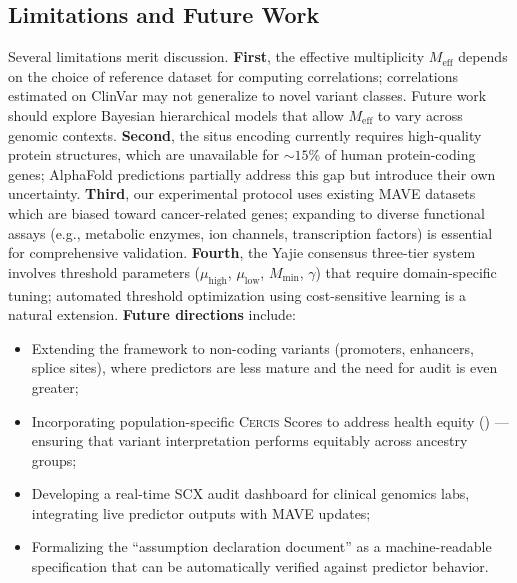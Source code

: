\documentclass[11pt,a4paper]{article}
\theoremstyle{definition}
\newcommand{\SCX}{\textsc{SCX}}
\newcommand{\cercis}{\textsc{Cercis}}
\newcommand{\genome}{}
\begin{document}
\subsection{Limitations and Future Work}
Several limitations merit discussion.
\textbf{First}, the effective multiplicity $M_{\text{eff}}$ depends on the choice of reference dataset for computing correlations; correlations estimated on ClinVar may not generalize to novel variant classes.
Future work should explore Bayesian hierarchical models that allow $M_{\text{eff}}$ to vary across genomic contexts.
\textbf{Second}, the situs encoding currently requires high-quality protein structures, which are unavailable for $\sim 15\%$ of human protein-coding genes; AlphaFold predictions partially address this gap but introduce their own uncertainty.
\textbf{Third}, our experimental protocol uses existing MAVE datasets which are biased toward cancer-related genes; expanding to diverse functional assays (e.g., metabolic enzymes, ion channels, transcription factors) is essential for comprehensive validation.
\textbf{Fourth}, the Yajie consensus three-tier system involves threshold parameters ($\mu_{\text{high}}$, $\mu_{\text{low}}$, $M_{\min}$, $\gamma$) that require domain-specific tuning; automated threshold optimization using cost-sensitive learning is a natural extension.
\textbf{Future directions} include:
\begin{itemize}[leftmargin=*]
    \item Extending the framework to non-coding variants (promoters, enhancers, splice sites), where predictors are less mature and the need for audit is even greater;
    \item Incorporating population-specific \cercis{} Scores to address health equity (\genome{}) — ensuring that variant interpretation performs equitably across ancestry groups;
    \item Developing a real-time \SCX{} audit dashboard for clinical genomics labs, integrating live predictor outputs with MAVE updates;
    \item Formalizing the ``assumption declaration document'' as a machine-readable specification that can be automatically verified against predictor behavior.
\end{itemize}
\end{document}
